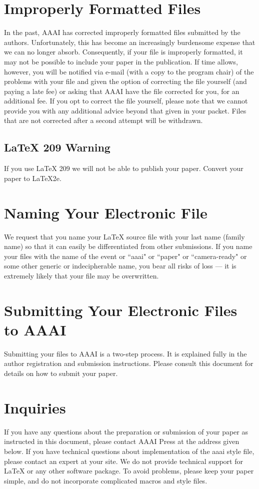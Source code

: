 \documentclass[letterpaper]{article}
\begin{document}
\section{Improperly Formatted Files }
In the past, AAAI has corrected improperly formatted files submitted by the authors. Unfortunately, this has become an increasingly burdensome expense that we can no longer absorb. Consequently, if your file is improperly formatted, it may not be possible to include your paper in the publication. If time allows, however, you will be notified via e-mail (with a copy to the program chair) of the problems with your file and given the option of correcting the file yourself (and paying a late fee) or asking that AAAI have the file corrected for you, for an additional fee. If you opt to correct the file yourself, please note that we cannot provide you with any additional advice beyond that given in your packet. Files that are not corrected after a second attempt will be withdrawn.

\subsection{\LaTeX{} 209 Warning}
If you use \LaTeX{} 209 we will not be able to publish your paper. Convert your paper to \LaTeX{}2e.

\section{Naming Your Electronic File}
We request that you name your \LaTeX{} source file with your last name (family name) so that it can easily be differentiated from other submissions. If you name your files with the name of the event or ``aaai" or ``paper" or ``camera-ready" or some other generic or indecipherable name, you bear all risks of loss --- it is extremely likely that your file may be overwritten.

\section{Submitting Your Electronic Files to AAAI}
Submitting your files to AAAI is a two-step process. It is explained fully in the author registration and submission instructions. Please consult this document for details on how to submit your paper.

\section{Inquiries} 
If you have any questions about the preparation or submission of your paper as instructed in this document, please contact AAAI Press at the address given below. If you have technical questions about implementation of the aaai style file, please contact an expert at your site. We do not provide technical support for \LaTeX{} or any other software package. To avoid problems, please keep your paper simple, and do not incorporate complicated macros and style files.
\end{document}
